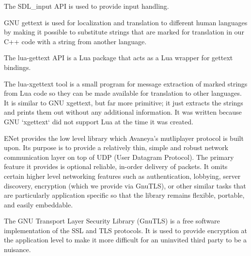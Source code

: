 
The SDL_input API is used to provide input handling.
\stopitemize


\startitemize[4]
\setupwhitespace[big]

GNU gettext is used for localization and translation to different human languages by making it possible to substitute strings that are marked for translation in our C++ code with a string from another language.


The lua-gettext API is a Lua package that acts as a Lua wrapper for gettext bindings.


The lua-xgettext tool is a small program for message extraction of marked strings from Lua code so they can be made available for translation to other languages. It is similar to GNU xgettext, but far more primitive; it just extracts the strings and prints them out without any additional information. It was written because GNU `xgettext` did not support Lua at the time it was created.
\stopitemize


\startitemize[4]
\setupwhitespace[big]

ENet provides the low level library which Avaneya's mutliplayer protocol is built upon. Its purpose is to provide a relatively thin, simple and robust network communication layer on top of UDP (User Datagram Protocol). The primary feature it provides is optional reliable, in-order delivery of packets. It omits certain higher level networking features such as authentication, lobbying, server discovery, encryption (which we provide via GnuTLS), or other similar tasks that are particularly application specific so that the library remains flexible, portable, and easily embeddable.


The GNU Transport Layer Security Library (GnuTLS) is a free software implementation of the SSL and TLS protocols. It is used to provide encryption at the application level to make it more difficult for an uninvited third party to be a nuisance.
\stopitemize


